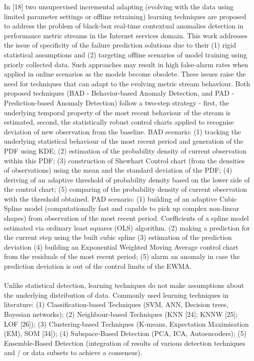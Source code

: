 \documentclass[]{usiinfprospectus}
\begin{document}
In [18] two unsupervised incremental adapting (evolving with the data using limited parameter settings or offline retraining) learning techniques are proposed to address the problem of black-box real-time contextual anomalies detection in performance metric streams in the Internet services domain. This work addresses the issue of specificity of the failure prediction solutions due to their (1) rigid statistical assumptions and (2) targeting offline scenarios of model training using priorly collected data. Such approaches may result in high false-alarm rates when applied in online scenarios as the models become obsolete. These issues raise the need for techniques that can adapt to the evolving metric stream behaviour. Both proposed techniques (BAD - Behavior-based Anomaly Detection, and PAD - Prediction-based Anomaly Detection) follow a two-step strategy - first, the underlying temporal property of the most recent behaviour of the stream is estimated, second, the statistically robust control charts applied to recognise deviation of new observation from the baseline.
BAD scenario: (1) tracking the underlying statistical behaviour of the most recent period and generation of the PDF using KDE; (2) estimation of the probability density of current observation within this PDF; (3) construction of Shewhart Control chart (from the densities of observations) using the mean and the standard deviation of the PDF; (4) deriving of an adaptive threshold of probability density based on the lower side of the control chart; (5) comparing of the probability density of current observation with the threshold obtained.
PAD scenario: (1) building of an adaptive Cubic Spline model (computationally fast and capable to pick up complex non-linear shapes) from observation of the most recent period. Coefficients of a spline model estimated via ordinary least squares (OLS) algorithm. (2) making a prediction for the current step using the built cubic spline (3) estimation of the prediction deviation (4) building an Exponential Weighted Moving Average control chart from the residuals of the most recent period; (5) alarm an anomaly in case the prediction deviation is out of the control limits of the EWMA.\\\\
%
Unlike statistical detection, learning techniques do not make assumptions about the underlying distribution of data. Commonly used learning techniques in literature: (1) Classification-based Techniques (SVM, ANN, Decision trees, Bayesian networks); (2) Neighbour-based Techniques (KNN [24]; KNNW [25]; LOF [26]); (3) Clustering-based Techniques (K-means, Expectation Maximisation (EM), SOM [34]); (4) Subspace-Based Detection (PCA, ICA, Autoencoders); (5) Ensemble-Based Detection (integration of results of various detection techniques and / or data subsets to achieve a consensus).
%
\end{document}
